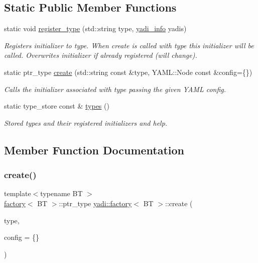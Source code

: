 \subsection*{Static Public Member Functions}
\begin{DoxyCompactItemize}
\item 
static void \hyperlink{structyadi_1_1factory_a512c17ea9ca1bde8dec81c22b08e5278}{register\+\_\+type} (std\+::string type, \hyperlink{structyadi_1_1factory_1_1yadi__info}{yadi\+\_\+info} yadis)
\begin{DoxyCompactList}\small\item\em Registers initializer to type. When create is called with type this initializer will be called. Overwrites initializer if already registered (will change). \end{DoxyCompactList}\item 
static ptr\+\_\+type \hyperlink{structyadi_1_1factory_a600474900d2c6fa5d09935a641298bd5}{create} (std\+::string const \&type, Y\+A\+M\+L\+::\+Node const \&config=\{\})
\begin{DoxyCompactList}\small\item\em Calls the initializer associated with type passing the given Y\+A\+ML config. \end{DoxyCompactList}\item 
static type\+\_\+store const  \& \hyperlink{structyadi_1_1factory_aa167d70b963561d24c8a32f680d7e8c0}{types} ()
\begin{DoxyCompactList}\small\item\em Stored types and their registered initializers and help. \end{DoxyCompactList}\end{DoxyCompactItemize}


\subsection{Member Function Documentation}
\mbox{\label{structyadi_1_1factory_a600474900d2c6fa5d09935a641298bd5}} 
\subsubsection{\texorpdfstring{create()}{create()}}
{\footnotesize\ttfamily template$<$typename BT $>$ \\
\hyperlink{structyadi_1_1factory}{factory}$<$ BT $>$\+::ptr\+\_\+type \hyperlink{structyadi_1_1factory}{yadi\+::factory}$<$ BT $>$\+::create (\begin{DoxyParamCaption}\item[{std\+::string const \&}]{type,  }\item[{Y\+A\+M\+L\+::\+Node const \&}]{config = {\ttfamily \{\}} }\end{DoxyParamCaption})\hspace{0.3cm}{\ttfamily [static]}}



